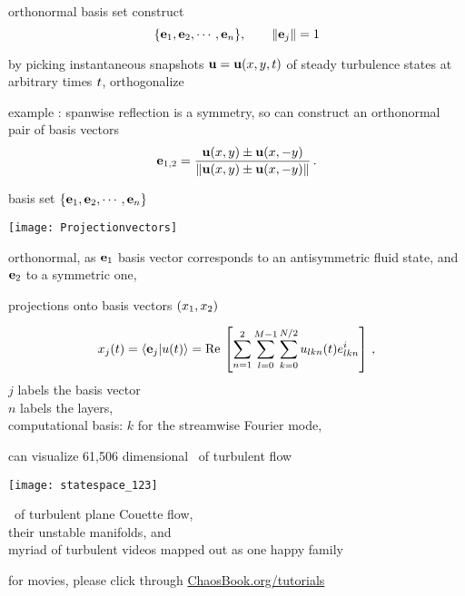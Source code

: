 \begin{frame}{orthonormal basis set}
construct
\[
\{{\bf e}_1, {\bf e}_2, \cdots, {\bf e}_n\}, \qquad \|{{\bf e}_j}\|=1
\]

by picking instantaneous snapshots
\(
{\bf u} = {\bf u}(x,y,t)
\)
of steady turbulence states at arbitrary
times $t$, orthogonalize

\bigskip

example : spanwise reflection is a symmetry, so can construct
an orthonormal pair of basis vectors
\[ %
\be_{1,2} = \frac{\bu(x,y) \pm \bu(x,-y)}{\Norm{\bu(x,y) \pm \bu(x,-y)}}
\,.
\] %
\end{frame}

\begin{frame}{basis set $\{{\bf e}_1, {\bf e}_2, \cdots, {\bf e}_n\}$}
\begin{block}{}
\begin{center}
    \texttt{[image: Projectionvectors]}
\end{center}
\end{block}
orthonormal, as ${\bf e}_1$ basis vector corresponds to an antisymmetric fluid state,
and ${\bf e}_2$ to a symmetric one, \etc
\end{frame}

\begin{frame}{projections onto basis vectors $(x_1, x_2)$}
\begin{block}{}
\[
\ssp_j(\zeit)  = \braket{\be_{j}}{u(\zeit)}
=\Re \left[\sum_{n=1}^2\sum_{l=0}^{M-1}\sum_{k=0}^{N/2}
u_{lkn}(\zeit) e^i_{lkn} \right]
\,,
\] %
$j$ labels the basis vector
\\
$n$ labels the layers,
\\
computational basis:
$k$ for the streamwise Fourier mode, \etc
\end{block}
\end{frame}

\begin{frame}{can visualize 61,506 dimensional \statesp\ of turbulent flow}
\begin{center}
\texttt{[image: statespace\_123]}
\end{center}
\eqva\ of turbulent plane Couette flow,
\\
their unstable manifolds, and
\\
myriad of turbulent videos mapped out as one happy family

\bigskip

\hfill   \vfill

{\scriptsize
          for movies, please click through
            \textcolor{blue}{\href{http://ChaosBook.org/tutorials}
             {ChaosBook.org/tutorials}}
          }
\end{frame}

